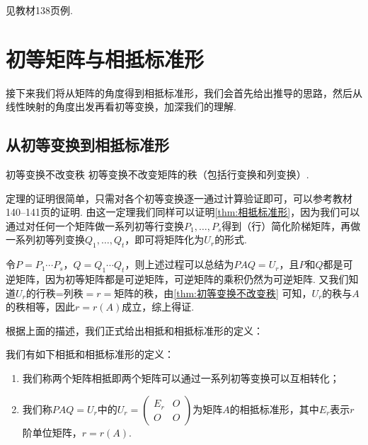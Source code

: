 \begin{solution}
    见教材138页例.
\end{solution}

\section{初等矩阵与相抵标准形}

接下来我们将从矩阵的角度得到相抵标准形，我们会首先给出推导的思路，然后从线性映射的角度出发再看初等变换，加深我们的理解.

\subsection{从初等变换到相抵标准形}

\begin{theorem}{}{初等变换不改变秩}
    初等变换不改变矩阵的秩（包括行变换和列变换）.
\end{theorem}

定理的证明很简单，只需对各个初等变换逐一通过计算验证即可，可以参考教材140--141页的证明. 由这一定理我们同样可以证明\autoref*{thm:相抵标准形}，因为我们可以通过对任何一个矩阵做一系列初等行变换$P_1,\ldots,P_s$得到（行）简化阶梯矩阵，再做一系列初等列变换$Q_1,\ldots,Q_t$，即可将矩阵化为$U_r$的形式.

令$P=P_1\cdots P_s$，$Q=Q_1\cdots Q_t$，则上述过程可以总结为$PAQ=U_r$，且$P$和$Q$都是可逆矩阵，因为初等矩阵都是可逆矩阵，可逆矩阵的乘积仍然为可逆矩阵. 又我们知道$U_r$的行秩=列秩$=r=$矩阵的秩，由\autoref{thm:初等变换不改变秩} 可知，$U_r$的秩与$A$的秩相等，因此$r=r(A)$成立，综上得证.

根据上面的描述，我们正式给出相抵和相抵标准形的定义：
\begin{definition}{}{}
    我们有如下相抵和相抵标准形的定义：
    \begin{enumerate}
        \item 我们称两个矩阵相抵即两个矩阵可以通过一系列初等变换可以互相转化；

        \item 我们称$PAQ=U_r$中的$U_r=\begin{pmatrix}
                      E_r & O \\ O & O
                  \end{pmatrix}$为矩阵$A$的相抵标准形，其中$E_r$表示$r$阶单位矩阵，$r=r(A)$.
    \end{enumerate}
\end{definition}

